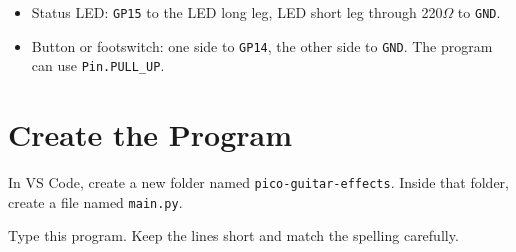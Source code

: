\documentclass[11pt,letterpaper]{article}
\newcommand{\pin}[1]{\texttt{#1}}
\begin{document}
\begin{itemize}
    \item Status LED: \pin{GP15} to the LED long leg, LED short leg through 220$\Omega$ to \texttt{GND}.
    \item Button or footswitch: one side to \pin{GP14}, the other side to \texttt{GND}. The program can use \texttt{Pin.PULL\_UP}.
\end{itemize}

\section*{Create the Program}
In VS Code, create a new folder named \texttt{pico-guitar-effects}. Inside that folder, create a file named \texttt{main.py}.

Type this program. Keep the lines short and match the spelling carefully.
\end{document}
